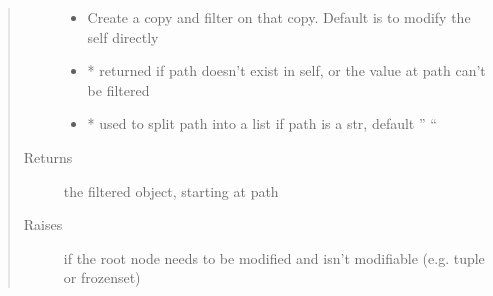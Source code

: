 \documentclass[a4paper,10pt,english]{sphinxmanual}
\begin{document}
\begin{fulllineitems}
\begin{fulllineitems}
\begin{quote}
\begin{description}
\begin{itemize}
\item {}
\sphinxAtStartPar
{} \textendash{} Create a copy and filter on that copy. Default is to modify the self directly

\item {}
\sphinxAtStartPar
{} \textendash{} * returned if path doesn’t exist in self, or the value at path can’t be filtered

\item {}
\sphinxAtStartPar
{} \textendash{} * used to split path into a list if path is a str, default ” “

\end{itemize}

\item[{Returns}] \leavevmode
\sphinxAtStartPar
the filtered object, starting at path

\item[{Raises}] \leavevmode
\sphinxAtStartPar
{} \textendash{} if the root node needs to be modified and isn’t modifiable (e.g. tuple or frozenset)

\end{description}\end{quote}

\end{fulllineitems}



\end{fulllineitems}
\end{document}
